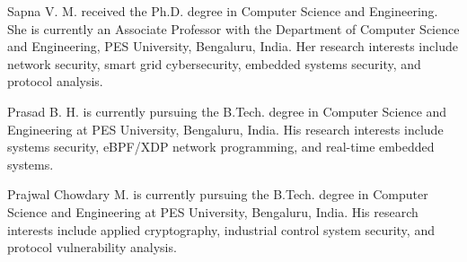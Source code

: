 \documentclass{ieeeaccess}
\begin{document}



\begin{IEEEbiographynophoto}{Sapna V. M.}
received the Ph.D. degree in Computer Science and Engineering. She is currently an Associate Professor with the Department of Computer Science and Engineering, PES University, Bengaluru, India. Her research interests include network security, smart grid cybersecurity, embedded systems security, and protocol analysis.
\end{IEEEbiographynophoto}

\begin{IEEEbiographynophoto}{Prasad B. H.}
is currently pursuing the B.Tech. degree in Computer Science and Engineering at PES University, Bengaluru, India. His research interests include systems security, eBPF/XDP network programming, and real-time embedded systems.
\end{IEEEbiographynophoto}

\begin{IEEEbiographynophoto}{Prajwal Chowdary M.}
is currently pursuing the B.Tech. degree in Computer Science and Engineering at PES University, Bengaluru, India. His research interests include applied cryptography, industrial control system security, and protocol vulnerability analysis.
\end{IEEEbiographynophoto}

\EOD
\end{document}
